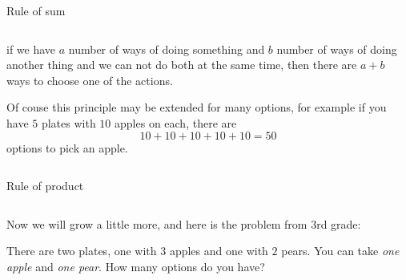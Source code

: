 \documentclass[9pt,aspectratio=169]{beamer}
\begin{document}
\begin{frame}{Rule of sum}
\begin{columns}[T]
\begin{column}{0.5\textwidth}
      \begin{definition}{}
        if we have $a$ number of ways of doing something and $b$ number of ways of doing another thing and we can not do both at the same time, then there are $a + b$ ways to choose one of the actions.
      \end{definition}

      Of couse this principle may be extended for many options, for example if you have $5$ plates with $10$ apples on each, there are 
      \[10+10+10+10+10 = 50\] 
      options to pick an apple.
    \end{column}
  \end{columns}
\end{frame}

\begin{frame}{Rule of product}
  \begin{columns}[T]
    \begin{column}{0.5\textwidth}
      Now we will grow a little more, and here is the problem from 3rd grade:

      \begin{problem}
        There are two plates, one with $3$ apples and one with $2$ pears. You can take \emph{one apple} and \emph{one pear}. How many options do you have?
      \end{problem}

      \begin{nscenter}
      \end{nscenter}


\end{column}
\end{columns}
\end{frame}
\end{document}
